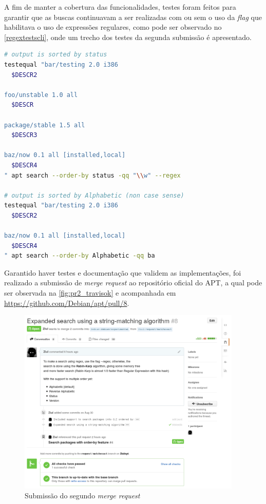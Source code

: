 A fim de manter a cobertura das funcionalidades, testes foram feitos para garantir que as buscas continuavam a ser realizadas com ou sem o uso da \textit{flag} que habilitava o uso de expressões regulares, como pode ser observado no \autoref{regextestscli}, onde um trecho dos testes da segunda submissão é apresentado.

\begin{lstlisting}[language=Bash,label=regextestscli,caption={Teste com e sem o uso de expressões regulares}]
# output is sorted by status
testequal "bar/testing 2.0 i386
  $DESCR2

foo/unstable 1.0 all
  $DESCR

package/stable 1.5 all
  $DESCR3

baz/now 0.1 all [installed,local]
  $DESCR4
" apt search --order-by status -qq "\\w" --regex

# output is sorted by Alphabetic (non case sense)
testequal "bar/testing 2.0 i386
  $DESCR2

baz/now 0.1 all [installed,local]
  $DESCR4
" apt search --order-by Alphabetic -qq ba
\end{lstlisting}

Garantido haver testes e documentação que validem as implementações, foi realizado a submissão de \textit{merge request} ao repositório oficial do APT, a qual pode ser observada na \autoref{fig:pr2_travisok} e acompanhada em \url{https://github.com/Debian/apt/pull/8}.

\begin{figure}[h]
  \centering
	\includegraphics[width=0.95\textwidth]{figuras/pr2}
  \caption{Submissão do segundo \textit{merge request}}
  \label{fig:pr2_travisok}
\end{figure}

